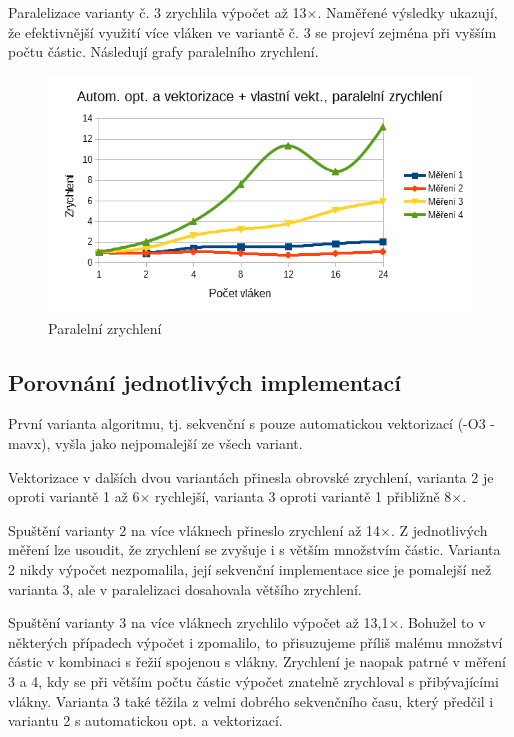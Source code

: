 \documentclass[12pt]{article}
\begin{document}
Paralelizace varianty č. 3 zrychlila výpočet až 13${\times}$. 
Naměřené výsledky ukazují, že efektivnější využití více vláken ve variantě č. 3 se projeví zejména při vyšším počtu částic.
Následují grafy paralelního zrychlení.

\begin{figure}[H]
  \begin{center}
     \includegraphics[width=12cm]{images/sdruzene/openmp/manacc.png}
    \caption{Paralelní zrychlení} 
  \end{center}
\end{figure}


\subsection{Porovnání jednotlivých implementací}
První varianta algoritmu, tj. sekvenční s pouze automatickou vektorizací (-O3 -mavx), vyšla jako nejpomalejší ze všech variant.

Vektorizace v dalších dvou variantách přinesla obrovské zrychlení, varianta 2 je oproti variantě 1 až 6${\times}$ rychlejší, varianta 3 oproti variantě 1 přibližně 8${\times}$.

Spuštění varianty 2 na více vláknech přineslo zrychlení až 14${\times}$. Z jednotlivých měření lze usoudit, že zrychlení se zvyšuje i s větším množstvím částic.
Varianta 2 nikdy výpočet nezpomalila, její sekvenční implementace sice je pomalejší než varianta 3, ale v paralelizaci dosahovala většího zrychlení.

Spuštění varianty 3 na více vláknech zrychlilo výpočet až 13,1${\times}$.
Bohužel to v některých případech výpočet i zpomalilo, to přisuzujeme příliš malému množství částic v kombinaci s řežií spojenou s vlákny.
Zrychlení je naopak patrné v měření 3 a 4, kdy se při větším počtu částic výpočet znatelně zrychloval s přibývajícími vlákny.
Varianta 3 také těžila z velmi dobrého sekvenčního času, který předčil i variantu 2 s automatickou opt. a vektorizací.
\end{document}
